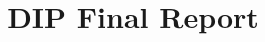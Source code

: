 \documentclass[a4paper]{article}
\title{DIP Final Report}
\begin{document}
\maketitle


\newpage
\begin{figure}
  
\end{figure}



\begin{figure}
  \centering
  
  
  
  
\end{figure}

% 
% 
% 
% 
% 
\end{document}
